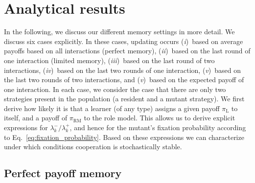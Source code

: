 \documentclass[11pt]{article}
\def\rolemodel{\text{RM}}
\def\learner{\text{L}}
\theoremstyle{plainCl1}
\theoremstyle{plainCl2}
\begin{document}
\newpage


\section{Analytical results}
\label{section:analyticalresults}


In the following, we discuss our different memory settings in more detail. 
We discuss six cases explicitly. In these cases, updating occurs
({\it i})~based on average payoffs based on all interactions (perfect memory), 
({\it ii})~based on the last round of one interaction (limited memory), 
({\it iii})~based on the last round of two interactions,
({\it iv})~based on the last two rounds of one interaction,
({\it v})~based on the last two rounds of two interactions, and
({\it v})~based on the expected payoff of one interaction.
In each case, we consider the case that there are only two strategies present in the population (a resident and a mutant strategy). 
We first derive how likely it is that a learner (of any type) assigns a given payoff $\pi_\learner$ to itself, and a payoff of $\pi_\rolemodel$ to the role model. 
This allows us to derive explicit expressions for $\lambda^-_k/\lambda^+_k$, and hence for the mutant's fixation probability according to Eq.~\eqref{eq:fixation_probability}.
Based on these expressions we can characterize under which conditions cooperation is stochastically stable.  



\subsection{Perfect payoff memory}\label{section:perfect_memory}

\end{document}

